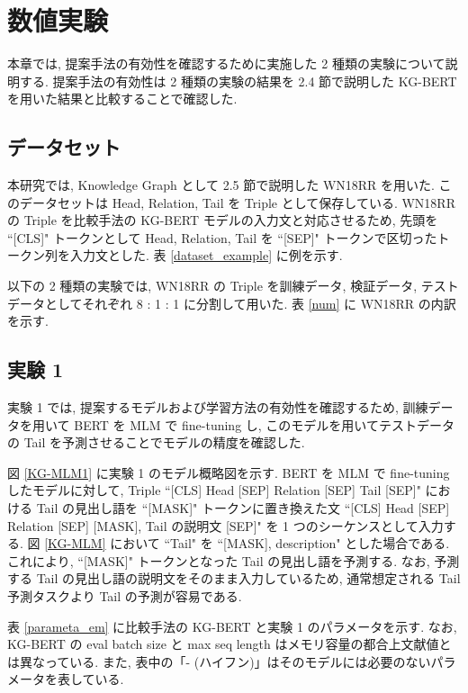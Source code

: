 \newpage
\changeindent{0cm}
\section{数値実験}
\changeindent{2cm}

本章では, 提案手法の有効性を確認するために実施した 2 種類の実験について説明する. 提案手法の有効性は 2 種類の実験の結果を 2.4 節で説明した KG-BERT を用いた結果と比較することで確認した. \par

\subsection{データセット}

本研究では, Knowledge Graph として 2.5 節で説明した WN18RR を用いた. このデータセットは Head, Relation, Tail を Triple として保存している. WN18RR の Triple を比較手法の KG-BERT モデルの入力文と対応させるため, 先頭を ``[CLS]" トークンとして Head, Relation, Tail を ``[SEP]" トークンで区切ったトークン列を入力文とした. 表 \ref{dataset_example} に例を示す. \par
以下の 2 種類の実験では, WN18RR の Triple を訓練データ, 検証データ, テストデータとしてそれぞれ 8 : 1 : 1 に分割して用いた. 表 \ref{num} に WN18RR の内訳を示す. \par

\subsection{実験 1}

実験 1 では, 提案するモデルおよび学習方法の有効性を確認するため, 訓練データを用いて BERT を MLM で fine-tuning し, このモデルを用いてテストデータの Tail を予測させることでモデルの精度を確認した. \par
図 \ref{KG-MLM1} に実験 1 のモデル概略図を示す. BERT を MLM で fine-tuning したモデルに対して, Triple ``[CLS] Head [SEP] Relation [SEP] Tail [SEP]" における Tail の見出し語を ``[MASK]" トークンに置き換えた文 ``[CLS] Head [SEP] Relation [SEP] [MASK], Tail の説明文 [SEP]" を 1 つのシーケンスとして入力する. 図 \ref{KG-MLM} において ``Tail" を ``[MASK], description" とした場合である. これにより, ``[MASK]" トークンとなった Tail の見出し語を予測する. なお, 予測する Tail の見出し語の説明文をそのまま入力しているため, 通常想定される Tail 予測タスクより Tail の予測が容易である. \par
表 \ref{parameta_em} に比較手法の KG-BERT と実験 1 のパラメータを示す. なお, KG-BERT の eval batch size と max seq length はメモリ容量の都合上文献値とは異なっている. また, 表中の「- (ハイフン)」はそのモデルには必要のないパラメータを表している. \par

